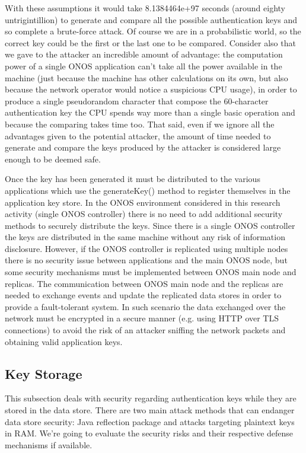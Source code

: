 \documentclass[a4paper,10pt]{memoir}
\begin{document}
With these assumptions it would take 8.1384464e+97 seconds (around eighty untrigintillion) to generate and compare all the possible authentication keys and so complete a brute-force attack. Of course we are in a probabilistic world, so the correct key could be the first or the last one to be compared. Consider also that we gave to the attacker an incredible amount of advantage: the computation power of a single ONOS application can't take all the power available in the machine (just because the machine has other calculations on its own, but also because the network operator would notice a suspicious CPU usage), in order to produce a single pseudorandom character that compose the 60-character authentication key the CPU spends way more than a single basic operation and because the comparing takes time too. That said, even if we ignore all the advantages given to the potential attacker, the amount of time needed to generate and compare the keys produced by the attacker is considered large enough to be deemed safe.
\medskip

Once the key has been generated it must be distributed to the various applications which use the generateKey() method to register themselves in the application key store. In the ONOS environment considered in this research activity (single ONOS controller) there is no need to add additional security methods to securely distribute the keys. Since there is a single ONOS controller the keys are distributed in the same machine without any risk of information disclosure. However, if the ONOS controller is replicated using multiple nodes there is no security issue between applications and the main ONOS node, but some security mechanisms must be implemented between ONOS main node and replicas. The communication between ONOS main node and the replicas are needed to exchange events and update the replicated data stores in order to provide a fault-tolerant system. In such scenario the data exchanged over the network must be encrypted in a secure manner (e.g. using HTTP over TLS connections) to avoid the risk of an attacker sniffing the network packets and obtaining valid application keys.

\subsection{Key Storage}

This subsection deals with security regarding authentication keys while they are stored in the data store. There are two main attack methods that can endanger data store security: Java reflection package and attacks targeting plaintext keys in RAM. We're going to evaluate the security risks and their respective defense mechanisms if available.
\end{document}
